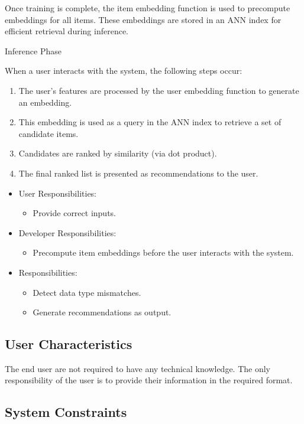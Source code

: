 \documentclass[12pt]{article}
\begin{document}
Once training is complete, the item embedding function is used to precompute embeddings for all items. These embeddings are stored in an ANN index for efficient retrieval during inference.

Inference Phase

When a user interacts with the system, the following steps occur:

\begin{enumerate}
    \item The user's features are processed by the user embedding function to generate an embedding.
    \item This embedding is used as a query in the ANN index to retrieve a set of candidate items.
    \item Candidates are ranked by similarity (via dot product).
    \item The final ranked list is presented as recommendations to the user.
\end{enumerate}

\begin{itemize}
  \item User Responsibilities:
  \begin{itemize}
  \item Provide correct inputs.
  \end{itemize}
  \item Developer Responsibilities:
  \begin{itemize}
  \item Precompute item embeddings before the user interacts with the system.
  \end{itemize}
  \item \progname{} Responsibilities:
  \begin{itemize}
  \item Detect data type mismatches.
  \item Generate recommendations as output.
  \end{itemize}
\end{itemize}
  

\subsection{User Characteristics} \label{SecUserCharacteristics}

The end user are not required to have any technical knowledge. The only responsibility of the user is to provide their information in the required format.

\subsection{System Constraints}
\end{document}
